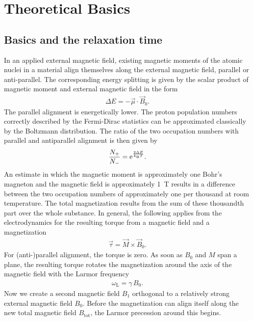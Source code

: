 \section{Theoretical Basics}



\subsection{Basics and the relaxation time}
In an applied external magnetic field, existing magnetic moments of the atomic nuclei in a material align themselves along the external magnetic field, parallel or anti-parallel.
The corresponding energy splitting is given by the scalar product of magnetic moment and external magnetic field in the form
\begin{align}
\Delta E=-\vec{\mu}\cdot\vec{B}_0.
\end{align}
The parallel alignment is energetically lower.
The proton population numbers correctly described by the Fermi-Dirac statistics can be approximated classically by the Boltzmann distribution.
The ratio of the two occupation numbers with parallel and antiparallel alignment is then given by
\begin{align}
\frac{N_+}{N_-}=\mathrm{e}^{\frac{2\Delta E}{k_\text{B}T}}.
\end{align}
An estimate in which the magnetic moment is approximately one Bohr's magneton and the magnetic field is approximately \SI{1}{\tesla} results in a difference between the two occupation numbers of approximately one per thousand at room temperature.
The total magnetization results from the sum of these thousandth part over the whole substance.
In general, the following applies from the electrodynamics for the resulting torque from a magnetic field and a magnetization
\begin{align}
\vec{\tau}=\vec{M}\times\vec{B}_0.
\end{align}
For (anti-)parallel alignment, the torque is zero.
As soon as $B_0$ and $M$ span a plane, the resulting torque rotates the magnetization around the axis of the magnetic field with the Larmor frequency
\begin{align}
\omega_\text{L}=\gamma\,B_0.
\label{eq:lamor}
\end{align}
Now we create a second magnetic field $B_1$ orthogonal to a relatively strong external magnetic field $B_0$.
Before the magnetization can align itself along the new total magnetic field $B_\text{tot}$, the Larmor precession around this begins.
